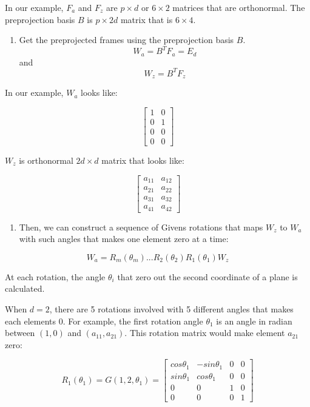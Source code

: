 In our example, \(F_a\) and \(F_z\) are \(p\times d\) or \(6\times2\) matrices that are orthonormal. The preprojection basis \(B\) is \(p\times 2d\) matrix that is \(6\times 4\).

\begin{enumerate}
\def\labelenumi{\arabic{enumi}.}
\setcounter{enumi}{1}
\tightlist
\item
  Get the preprojected frames using the preprojection basis \(B\).
  \[W_a = B^TF_a = E_d\] and \[W_z = B^TF_z\]
\end{enumerate}

In our example, \(W_a\) looks like:

\[ \begin{bmatrix}1 & 0 \\0  &1 \\ 0&0 \\0&0\end{bmatrix} \]

\(W_z\) is orthonormal \(2d\times d\) matrix that looks like:

\[ \begin{bmatrix} a_{11} & a_{12} \\a_{21}  &a_{22} \\ a_{31}&a_{32} \\a_{41}&a_{42}\end{bmatrix} \]

\begin{enumerate}
\def\labelenumi{\arabic{enumi}.}
\setcounter{enumi}{2}
\tightlist
\item
  Then, we can construct a sequence of Givens rotations that maps \(W_z\) to \(W_a\) with such angles that makes one element zero at a time:
\end{enumerate}

\[ W_a = R_m(\theta_m) ... R_2(\theta_2)R_1(\theta_1)W_z\]

At each rotation, the angle \(\theta_i\) that zero out the second coordinate of a plane is calculated.

When \(d = 2\), there are 5 rotations involved with 5 different angles that makes each elements 0. For example, the first rotation angle \(\theta_1\) is an angle in radian between \((1, 0)\) and \((a_{11}, a_{21})\). This rotation matrix would make element \(a_{21}\) zero:

\[R_1(\theta_1) = G(1, 2, \theta_1) = \begin{bmatrix} cos\theta_1 & -sin\theta_1 & 0 & 0 \\sin\theta_1  &cos\theta_1 & 0 &0 \\ 0&0&1&0 \\0&0&0&1\end{bmatrix}\]

